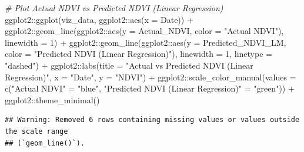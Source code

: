 \documentclass[
]{article}
\newenvironment{Shaded}{}{}
\newcommand{\AttributeTok}[1]{\textcolor[rgb]{0.49,0.56,0.16}{#1}}
\newcommand{\CommentTok}[1]{\textcolor[rgb]{0.38,0.63,0.69}{\textit{#1}}}
\newcommand{\DecValTok}[1]{\textcolor[rgb]{0.25,0.63,0.44}{#1}}
\newcommand{\FunctionTok}[1]{\textcolor[rgb]{0.02,0.16,0.49}{#1}}
\newcommand{\NormalTok}[1]{#1}
\newcommand{\OtherTok}[1]{\textcolor[rgb]{0.00,0.44,0.13}{#1}}
\newcommand{\SpecialCharTok}[1]{\textcolor[rgb]{0.25,0.44,0.63}{#1}}
\newcommand{\StringTok}[1]{\textcolor[rgb]{0.25,0.44,0.63}{#1}}
\begin{document}
\begin{Shaded}
\begin{Highlighting}[]
\CommentTok{\# Plot Actual NDVI vs Predicted NDVI (Linear Regression)}
\NormalTok{ggplot2}\SpecialCharTok{::}\FunctionTok{ggplot}\NormalTok{(viz\_data, ggplot2}\SpecialCharTok{::}\FunctionTok{aes}\NormalTok{(}\AttributeTok{x =}\NormalTok{ Date)) }\SpecialCharTok{+}
\NormalTok{  ggplot2}\SpecialCharTok{::}\FunctionTok{geom\_line}\NormalTok{(ggplot2}\SpecialCharTok{::}\FunctionTok{aes}\NormalTok{(}\AttributeTok{y =}\NormalTok{ Actual\_NDVI, }
                                  \AttributeTok{color =} \StringTok{"Actual NDVI"}\NormalTok{), }\AttributeTok{linewidth =} \DecValTok{1}\NormalTok{) }\SpecialCharTok{+}
\NormalTok{  ggplot2}\SpecialCharTok{::}\FunctionTok{geom\_line}\NormalTok{(ggplot2}\SpecialCharTok{::}\FunctionTok{aes}\NormalTok{(}\AttributeTok{y =}\NormalTok{ Predicted\_NDVI\_LM, }
                                  \AttributeTok{color =} \StringTok{"Predicted NDVI (Linear Regression)"}\NormalTok{), }
                     \AttributeTok{linewidth =} \DecValTok{1}\NormalTok{, }\AttributeTok{linetype =} \StringTok{"dashed"}\NormalTok{) }\SpecialCharTok{+}
\NormalTok{  ggplot2}\SpecialCharTok{::}\FunctionTok{labs}\NormalTok{(}\AttributeTok{title =} \StringTok{"Actual vs Predicted NDVI (Linear Regression)"}\NormalTok{,}
                \AttributeTok{x =} \StringTok{"Date"}\NormalTok{, }\AttributeTok{y =} \StringTok{"NDVI"}\NormalTok{) }\SpecialCharTok{+}
\NormalTok{  ggplot2}\SpecialCharTok{::}\FunctionTok{scale\_color\_manual}\NormalTok{(}\AttributeTok{values =} 
                                \FunctionTok{c}\NormalTok{(}\StringTok{"Actual NDVI"} \OtherTok{=} \StringTok{"blue"}\NormalTok{, }
                                  \StringTok{"Predicted NDVI (Linear Regression)"} \OtherTok{=} \StringTok{"green"}\NormalTok{)) }\SpecialCharTok{+}
\NormalTok{  ggplot2}\SpecialCharTok{::}\FunctionTok{theme\_minimal}\NormalTok{()}
\end{Highlighting}
\end{Shaded}

\begin{verbatim}
## Warning: Removed 6 rows containing missing values or values outside the scale range
## (`geom_line()`).
\end{verbatim}
\end{document}

